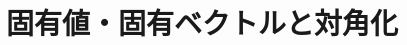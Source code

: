 \documentclass[../../topic_linear-algebra]{subfiles}
\begin{document}
\chapter{固有値・固有ベクトルと対角化}
\end{document}
